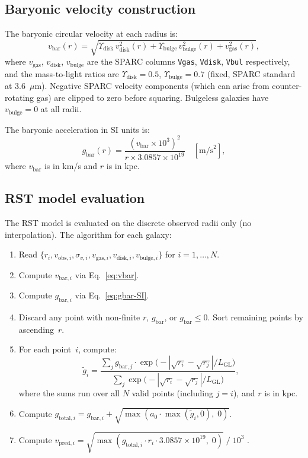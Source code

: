 \documentclass[11pt,a4paper]{article}
\begin{document}
\subsection{Baryonic velocity construction}

The baryonic circular velocity at each radius is:
\begin{equation}
\label{eq:vbar}
v_{\mathrm{bar}}(r) = \sqrt{\Upsilon_{\mathrm{disk}}\,v_{\mathrm{disk}}^2(r) + \Upsilon_{\mathrm{bulge}}\,v_{\mathrm{bulge}}^2(r) + v_{\mathrm{gas}}^2(r)},
\end{equation}
where $v_{\mathrm{gas}}$, $v_{\mathrm{disk}}$, $v_{\mathrm{bulge}}$ are the SPARC columns \texttt{Vgas}, \texttt{Vdisk}, \texttt{Vbul} respectively, and the mass-to-light ratios are $\Upsilon_{\mathrm{disk}} = 0.5$, $\Upsilon_{\mathrm{bulge}} = 0.7$ (fixed, SPARC standard at 3.6~$\mu$m).
Negative SPARC velocity components (which can arise from counter-rotating gas) are clipped to zero before squaring.
Bulgeless galaxies have $v_{\mathrm{bulge}} = 0$ at all radii.

The baryonic acceleration in SI units is:
\begin{equation}
\label{eq:gbar-SI}
g_{\mathrm{bar}}(r) = \frac{(v_{\mathrm{bar}} \times 10^3)^2}{r \times 3.0857 \times 10^{19}} \quad [\mathrm{m/s}^2],
\end{equation}
where $v_{\mathrm{bar}}$ is in km/s and $r$ is in kpc.

\subsection{RST model evaluation}
\label{app:rst-algorithm}

The RST model is evaluated on the discrete observed radii only (no interpolation).
The algorithm for each galaxy:

\begin{enumerate}
\item Read $\{r_i, v_{\mathrm{obs},i}, \sigma_{v,i}, v_{\mathrm{gas},i}, v_{\mathrm{disk},i}, v_{\mathrm{bulge},i}\}$ for $i = 1, \ldots, N$.
\item Compute $v_{\mathrm{bar},i}$ via Eq.~\eqref{eq:vbar}.
\item Compute $g_{\mathrm{bar},i}$ via Eq.~\eqref{eq:gbar-SI}.
\item Discard any point with non-finite $r$, $g_{\mathrm{bar}}$, or $g_{\mathrm{bar}} \leq 0$. Sort remaining points by ascending~$r$.
\item For each point~$i$, compute:
\begin{equation}
\tilde{g}_i = \frac{\sum_{j} g_{\mathrm{bar},j} \cdot \exp\!\bigl(-|\sqrt{r_i} - \sqrt{r_j}|/L_{\mathrm{GL}}\bigr)}{\sum_{j} \exp\!\bigl(-|\sqrt{r_i} - \sqrt{r_j}|/L_{\mathrm{GL}}\bigr)},
\end{equation}
where the sums run over all $N$ valid points (including $j = i$), and $r$ is in kpc.
\item Compute $g_{\mathrm{total},i} = g_{\mathrm{bar},i} + \sqrt{\max(a_0 \cdot \max(\tilde{g}_i, 0),\; 0)}$.
\item Compute $v_{\mathrm{pred},i} = \sqrt{\max(g_{\mathrm{total},i} \cdot r_i \cdot 3.0857 \times 10^{19},\; 0)} \;/\; 10^3$ \quad [km/s].
\end{enumerate}
\end{document}
